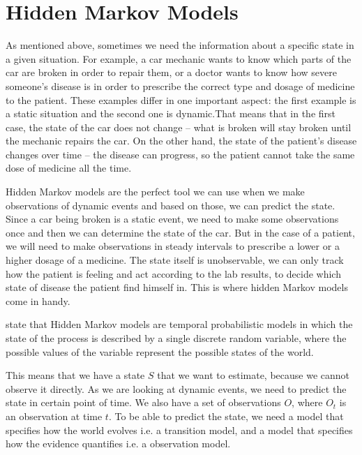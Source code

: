 \documentclass[a4paper]{article}
\begin{document}
\section{Hidden Markov Models}
As mentioned above, sometimes we need the information about a specific state in a given situation. For example, a car mechanic wants to know which parts of the car are broken in order to repair them, or a doctor wants to know how severe someone's disease is in order to prescribe the correct type and dosage of medicine to the patient. These examples differ in one important aspect: the first example is a static situation and the second one is dynamic.That means that in the first case, the state of the car does not change -- what is broken will stay broken until the mechanic repairs the car. On the other hand, the state of the patient's disease changes over time -- the disease can progress, so the patient cannot take the same dose of medicine all the time.

Hidden Markov models are the perfect tool we can use when we make observations of dynamic events and based on those, we can predict the state. Since a car being broken is a static event, we need to make some observations once and then we can determine the state of the car. But in the case of a patient, we will need to make observations in steady intervals to prescribe a lower or a higher dosage of a medicine. The state itself is unobservable, we can only track how the patient is feeling and act according to the lab results, to decide which state of disease the patient find himself in. This is where hidden Markov models come in handy.

\cite{russell2009artificial} state that Hidden Markov models are temporal probabilistic models in which the state of the process is described by a single discrete random variable, where the possible values of the variable represent the possible states of the world. 

This means that we have a state \ensuremath{S} that we want to estimate, because we cannot observe it directly. As we are looking at dynamic events, we need to predict the state in certain point of time. We also have a set of observations \ensuremath{O}, where \ensuremath{O_t} is an observation at time \ensuremath{t}. To be able to predict the state, we need a model that specifies how the world evolves i.e. a transition model, and a model that specifies how the evidence quantifies i.e. a observation model.
\end{document}
